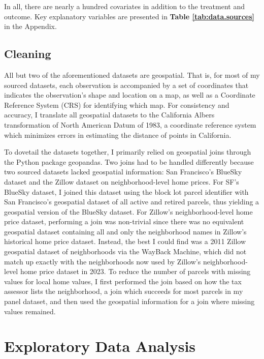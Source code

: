 \documentclass[a4paper,12pt]{article}
\begin{document}
In all, there are nearly a hundred covariates in addition to the treatment and outcome.  Key explanatory variables are presented in \textbf{Table \ref{tab:data.sources}} in the Appendix.

\subsection{Cleaning}

All but two of the aforementioned datasets are geospatial. That is, for most of my sourced datasets, each observation is accompanied by a set of coordinates that indicates the observation’s shape and location on a map, as well as a Coordinate Reference System (CRS) for identifying which map. For consistency and accuracy, I translate all geospatial datasets to the California Albers transformation of North American Datum of 1983, a coordinate reference system which minimizes errors in estimating the distance of points in California.

To dovetail the datasets together, I primarily relied on geospatial joins through the Python package geopandas. Two joins had to be handled differently because two sourced datasets lacked geospatial information: San Francisco’s BlueSky dataset and the Zillow dataset on neighborhood-level home prices. For SF’s BlueSky dataset, I joined this dataset using the block lot parcel identifier with San Francisco’s geospatial dataset of all active and retired parcels, thus yielding a geospatial version of the BlueSky dataset. For Zillow’s neighborhood-level home price dataset, performing a join was non-trivial since there was no equivalent geospatial dataset containing all and only the neighborhood names in Zillow’s historical home price dataset. Instead, the best I could find was a 2011 Zillow geospatial dataset of neighborhoods via the WayBack Machine, which did not match up exactly with the neighborhoods now used by Zillow’s neighborhood-level home price dataset in 2023. To reduce the number of parcels with missing values for local home values, I first performed the join based on how the tax assessor lists the neighborhood, a join which succeeds for most parcels in my panel dataset, and then used the geospatial information for a join where missing values remained.

\section{Exploratory Data Analysis}
\end{document}

